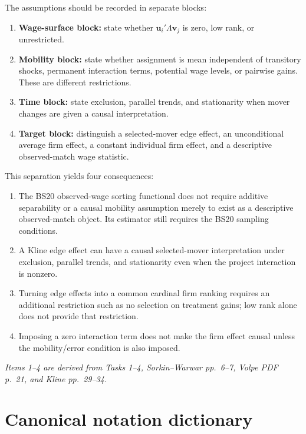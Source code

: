 \documentclass[11pt]{article}
\begin{document}
The assumptions should be recorded in separate blocks:

\begin{enumerate}
\item \textbf{Wage-surface block:} state whether
  \(\mathbf u_i'\Lambda\mathbf v_j\) is zero, low rank, or unrestricted.
\item \textbf{Mobility block:} state whether assignment is mean independent
  of transitory shocks, permanent interaction terms, potential wage levels,
  or pairwise gains.  These are different restrictions.
\item \textbf{Time block:} state exclusion, parallel trends, and stationarity
  when mover changes are given a causal interpretation.
\item \textbf{Target block:} distinguish a selected-mover edge effect,
  an unconditional average firm effect, a constant individual firm effect,
  and a descriptive observed-match wage statistic.
\end{enumerate}

This separation yields four consequences:

\begin{enumerate}
\item The BS20 observed-wage sorting functional does not require additive
  separability or a causal mobility assumption merely to exist as a
  descriptive observed-match object.  Its estimator still requires the
  BS20 sampling conditions.
\item A Kline edge effect can have a causal selected-mover interpretation
  under exclusion, parallel trends, and stationarity even when the project
  interaction is nonzero.
\item Turning edge effects into a common cardinal firm ranking requires an
  additional restriction such as no selection on treatment gains; low rank
  alone does not provide that restriction.
\item Imposing a zero interaction term does not make the firm effect causal
  unless the mobility/error condition is also imposed.
\end{enumerate}

\textit{Items 1--4 are derived from Tasks 1--4, Sorkin--Warwar pp.\ 6--7,
Volpe PDF p.\ 21, and Kline pp.\ 29--34.}

\clearpage
\appendix
\section{Canonical notation dictionary}
\end{document}
